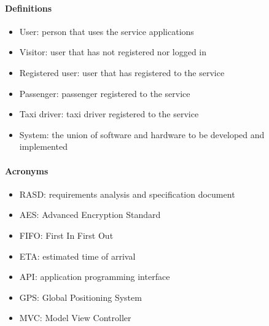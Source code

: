 \paragraph{Definitions}
\begin{itemize}
	\item User: person that uses the service applications
	\item Visitor: user that has not registered nor logged in
	\item Registered user: user that has registered to the service
	\item Passenger: passenger registered to the service
	\item Taxi driver: taxi driver registered to the service
	\item System: the union of software and hardware to be developed and implemented
\end{itemize}
\paragraph{Acronyms}
\begin{itemize}
	\item RASD: requirements analysis and specification document
	\item AES: Advanced Encryption Standard
	\item FIFO: First In First Out
	\item ETA: estimated time of arrival
	\item API: application programming interface
	\item GPS: Global Positioning System
	\item MVC: Model View Controller
\end{itemize}